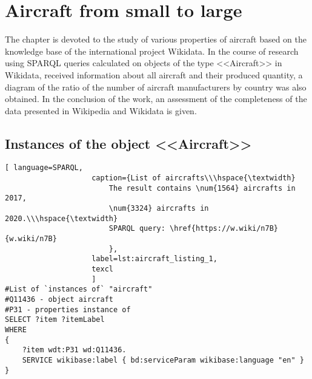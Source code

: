 \setchapterpreamble[u]{\margintoc}
\chapter{Aircraft from small to large\protect\footnotemark}


The chapter is devoted to the study of various properties of aircraft
based on the knowledge base of the international project Wikidata.
In the course of research using SPARQL queries calculated on objects of the type <<Aircraft>> in Wikidata,
received information about all aircraft and their produced quantity,
a diagram of the ratio of the number of aircraft manufacturers by country was also obtained.
In the conclusion of the work, an assessment of the completeness of the data presented in Wikipedia and Wikidata is given.


\section{Instances of the object <<Aircraft>>}

\begin{lstlisting}[ language=SPARQL, 
                    caption={List of aircrafts\\\hspace{\textwidth}
                        The result contains \num{1564} aircrafts in 2017, 
                        \num{3324} aircrafts in 2020.\\\hspace{\textwidth}
                        SPARQL query: \href{https://w.wiki/n7B}{w.wiki/n7B}
                        },
                    label=lst:aircraft_listing_1,
                    texcl 
                    ]
#List of `instances of` "aircraft"
#Q11436 - object aircraft 
#P31 - properties instance of
SELECT ?item ?itemLabel
WHERE
{
    ?item wdt:P31 wd:Q11436.
    SERVICE wikibase:label { bd:serviceParam wikibase:language "en" }
}
\end{lstlisting}



